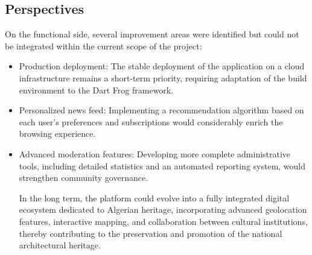 \documentclass[12pt]{article}
\begin{document}
\subsection{Perspectives}
On the functional side, several improvement areas were identified but could not be integrated within the current scope of the project:
\begin{itemize}
    \item Production deployment: The stable deployment of the application on a cloud infrastructure remains a short-term priority, requiring adaptation of the build environment to the Dart Frog framework.
    \item Personalized news feed: Implementing a recommendation algorithm based on each user's preferences and subscriptions would considerably enrich the browsing experience.
    \item Advanced moderation features: Developing more complete administrative tools, including detailed statistics and an automated reporting system, would strengthen community governance.

\vspace{0.5cm}

In the long term, the platform could evolve into a fully integrated digital ecosystem dedicated to Algerian heritage, incorporating advanced geolocation features, interactive mapping, and collaboration between cultural institutions, thereby contributing to the preservation and promotion of the national architectural heritage.
\end{itemize}
\end{document}

